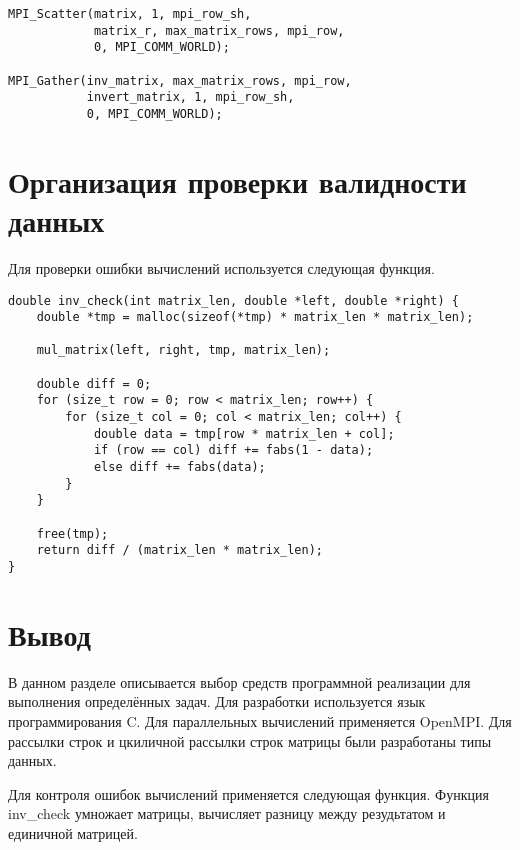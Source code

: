 \begin{small}
    \begin{verbatim}
MPI_Scatter(matrix, 1, mpi_row_sh,
            matrix_r, max_matrix_rows, mpi_row,
            0, MPI_COMM_WORLD);

MPI_Gather(inv_matrix, max_matrix_rows, mpi_row,
           invert_matrix, 1, mpi_row_sh,
           0, MPI_COMM_WORLD);
    \end{verbatim}
\end{small}


\section{Организация проверки валидности данных}


Для проверки ошибки вычислений используется следующая функция.


\begin{small}
    \begin{verbatim}
double inv_check(int matrix_len, double *left, double *right) {
    double *tmp = malloc(sizeof(*tmp) * matrix_len * matrix_len);

    mul_matrix(left, right, tmp, matrix_len);

    double diff = 0;
    for (size_t row = 0; row < matrix_len; row++) {
        for (size_t col = 0; col < matrix_len; col++) {
            double data = tmp[row * matrix_len + col];
            if (row == col) diff += fabs(1 - data);
            else diff += fabs(data);
        }
    }

    free(tmp);
    return diff / (matrix_len * matrix_len);
}
    \end{verbatim}
\end{small}


\section*{Вывод}

В данном разделе описывается выбор средств программной реализации для выполнения определённых задач.
Для разработки используется язык программирования C. Для параллельных вычислений применяется OpenMPI.
Для рассылки строк и цкиличной рассылки строк матрицы были разработаны типы данных.

Для контроля ошибок вычислений применяется следующая функция.
Функция inv\_check умножает матрицы, вычисляет разницу между резудьтатом и единичной матрицей.

